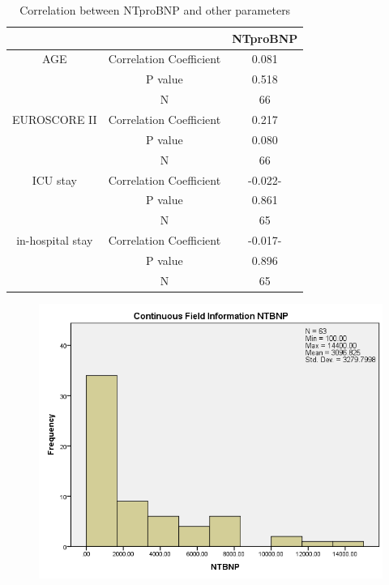 \documentclass[14pt,a4paper,onecolumn]{extarticle}
\begin{document}
\begin{table}[]
\centering
\caption{Correlation between NTproBNP and other parameters}
\label{Result_correl_parameters}
\begin{tabular}{ccc}
    \hline
                 &                         & NTproBNP \\\hline
AGE              & Correlation Coefficient & 0.081     \\
                 & P value                 & 0.518     \\
                 & N                       & 66       \\
EUROSCORE II     & Correlation Coefficient & 0.217     \\
                 & P value                 & 0.080     \\
                 & N                       & 66       \\
ICU stay         & Correlation Coefficient & -0.022-   \\
                 & P value                 & 0.861     \\
                 & N                       & 65       \\
in-hospital stay & Correlation Coefficient & -0.017-   \\
                 & P value                 & 0.896     \\
                 & N                       & 65

\end{tabular}
\end{table}

\clearpage
\begin{figure}
    \centering
    \includegraphics[scale=0.7]{./images/cont_ntprobnp.png}
    \caption{}
    \label{}
\end{figure}
\end{document}
